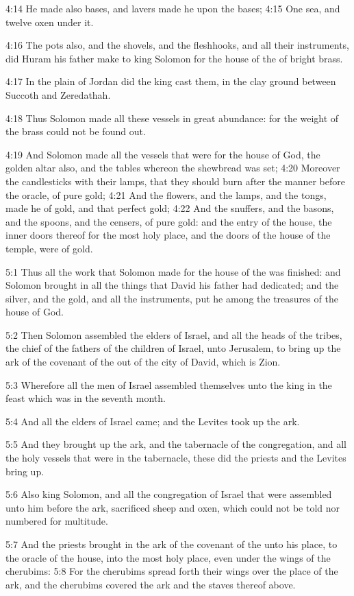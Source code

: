 4:14 He made also bases, and lavers made he upon the bases; 4:15 One sea, and twelve oxen under it.

4:16 The pots also, and the shovels, and the fleshhooks, and all their instruments, did Huram his father make to king Solomon for the house of the \LORD of bright brass.

4:17 In the plain of Jordan did the king cast them, in the clay ground between Succoth and Zeredathah.

4:18 Thus Solomon made all these vessels in great abundance: for the weight of the brass could not be found out.

4:19 And Solomon made all the vessels that were for the house of God, the golden altar also, and the tables whereon the shewbread was set; 4:20 Moreover the candlesticks with their lamps, that they should burn after the manner before the oracle, of pure gold; 4:21 And the flowers, and the lamps, and the tongs, made he of gold, and that perfect gold; 4:22 And the snuffers, and the basons, and the spoons, and the censers, of pure gold: and the entry of the house, the inner doors thereof for the most holy place, and the doors of the house of the temple, were of gold.

5:1 Thus all the work that Solomon made for the house of the \LORD was finished: and Solomon brought in all the things that David his father had dedicated; and the silver, and the gold, and all the instruments, put he among the treasures of the house of God.

5:2 Then Solomon assembled the elders of Israel, and all the heads of the tribes, the chief of the fathers of the children of Israel, unto Jerusalem, to bring up the ark of the covenant of the \LORD out of the city of David, which is Zion.

5:3 Wherefore all the men of Israel assembled themselves unto the king in the feast which was in the seventh month.

5:4 And all the elders of Israel came; and the Levites took up the ark.

5:5 And they brought up the ark, and the tabernacle of the congregation, and all the holy vessels that were in the tabernacle, these did the priests and the Levites bring up.

5:6 Also king Solomon, and all the congregation of Israel that were assembled unto him before the ark, sacrificed sheep and oxen, which could not be told nor numbered for multitude.

5:7 And the priests brought in the ark of the covenant of the \LORD unto his place, to the oracle of the house, into the most holy place, even under the wings of the cherubims: 5:8 For the cherubims spread forth their wings over the place of the ark, and the cherubims covered the ark and the staves thereof above.

